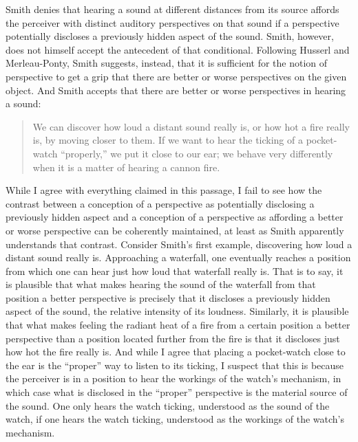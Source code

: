 Smith denies that hearing a sound at different distances from its source affords the perceiver with distinct auditory perspectives on that sound if a perspective potentially discloses a previously hidden aspect of the sound. Smith, however, does not himself accept the antecedent of that conditional. Following Husserl and Merleau-Ponty, Smith suggests, instead, that it is sufficient for the notion of perspective to get a grip that there are better or worse perspectives on the given object. And Smith accepts that there are better or worse perspectives in hearing a sound:
\begin{quote}
	We can discover how loud a distant sound really is, or how hot a fire really is, by moving closer to them. If we want to hear the ticking of a pocket-watch ``properly,'' we put it close to our ear; we behave very differently when it is a matter of hearing a cannon fire. \citep[135]{Smith:2002sa}
\end{quote}
While I agree with everything claimed in this passage, I fail to see how the contrast between a conception of a perspective as potentially disclosing a previously hidden aspect and a conception of a perspective as affording a better or worse perspective can be coherently maintained, at least as Smith apparently understands that contrast. Consider Smith's first example, discovering how loud a distant sound really is. Approaching a waterfall, one eventually reaches a position from which one can hear just how loud that waterfall really is. That is to say, it is plausible that what makes hearing the sound of the waterfall from that position a better perspective is precisely that it discloses a previously hidden aspect of the sound, the relative intensity of its loudness. Similarly, it is plausible that what makes feeling the radiant heat of a fire from a certain position a better perspective than a position located further from the fire is that it discloses just how hot the fire really is. And while I agree that placing a pocket-watch close to the ear is the ``proper'' way to listen to its ticking, I suspect that this is because the perceiver is in a position to hear the workings of the watch's mechanism, in which case what is disclosed in the ``proper'' perspective is the material source of the sound. One only hears the watch ticking, understood as the sound of the watch, if one hears the watch ticking, understood as the workings of the watch's mechanism.

